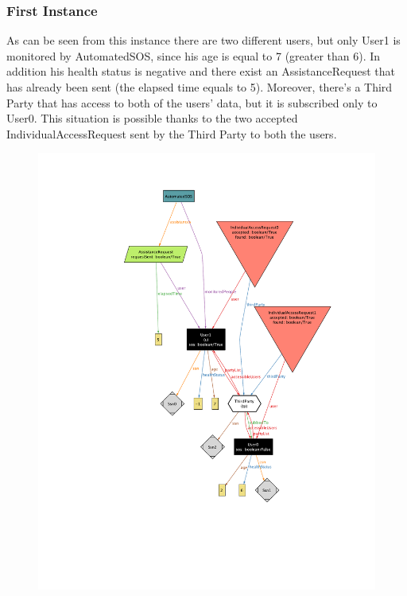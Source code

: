 \documentclass[12pt,a4paper]{article}
\begin{document}
		\subsubsection{First Instance}
			As can be seen from this instance there are two different users, but only User1 is monitored by AutomatedSOS, since his age is equal to 7 (greater than 6). In addition his health status is negative and there exist an AssistanceRequest that has already been sent (the elapsed time equals to 5). 
			Moreover, there's a Third Party that has access to both of the users' data, but it is subscribed only to User0. This situation is possible thanks to the two accepted IndividualAccessRequest sent by the Third Party to both the users.\\
			\begin{figure}[H]
				\centering
				\includegraphics[height=1.0\linewidth]{Images/first-world}
				\label{fig:first-world}
			\end{figure}
\end{document}
